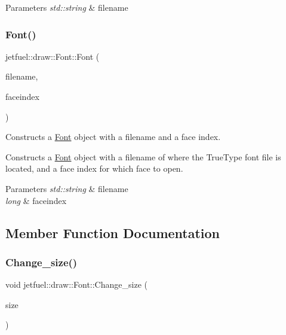 \begin{DoxyParams}{Parameters}
{\em std\+::string} & filename \\
\hline
\end{DoxyParams}
\mbox{\label{classjetfuel_1_1draw_1_1Font_a5907cc1ecc14725d642ef5c3c753ced9}} 
\subsubsection{\texorpdfstring{Font()}{Font()}\hspace{0.1cm}{\footnotesize\ttfamily [3/3]}}
{\footnotesize\ttfamily jetfuel\+::draw\+::\+Font\+::\+Font (\begin{DoxyParamCaption}\item[{const std\+::string}]{filename,  }\item[{const long}]{faceindex }\end{DoxyParamCaption})}



Constructs a \hyperlink{classjetfuel_1_1draw_1_1Font}{Font} object with a filename and a face index. 

Constructs a \hyperlink{classjetfuel_1_1draw_1_1Font}{Font} object with a filename of where the True\+Type font file is located, and a face index for which face to open.


\begin{DoxyParams}{Parameters}
{\em std\+::string} & filename \\
\hline
{\em long} & faceindex \\
\hline
\end{DoxyParams}


\subsection{Member Function Documentation}
\mbox{\label{classjetfuel_1_1draw_1_1Font_a2a99e3273204f9dca27017c568f1eefe}} 
\subsubsection{\texorpdfstring{Change\+\_\+size()}{Change\_size()}}
{\footnotesize\ttfamily void jetfuel\+::draw\+::\+Font\+::\+Change\+\_\+size (\begin{DoxyParamCaption}\item[{const unsigned int}]{size }\end{DoxyParamCaption})}



